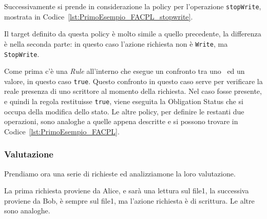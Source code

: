 Successivamente si prende in considerazione la policy per l'operazione \texttt{stopWrite}, mostrata in Codice~\ref{lst:PrimoEsempio_FACPL_stopwrite}.

Il target definito da questa policy è molto simile a quello precedente, la differenza è nella seconda parte: in questo caso l'azione richiesta non è \texttt{Write}, ma \texttt{StopWrite}.\par
Come prima c'è una \textit{Rule} all'interno che esegue un confronto tra uno \statusattribute\ ed un valore, in questo caso \texttt{true}. Questo confronto in questo caso serve per verificare la reale presenza di uno scrittore al momento della richiesta. 
Nel caso fosse presente, e quindi la regola restituisse \texttt{true}, viene eseguita la Obligation Status che si occupa della modifica dello stato.
Le altre policy, per definire le restanti due operazioni, sono analoghe a quelle appena descritte e si possono trovare in Codice~\ref{lst:PrimoEsempio_FACPL}.
\subsubsection{Valutazione}
Prendiamo ora una serie di richieste ed analizziamone la loro valutazione.

La prima richiesta proviene da Alice, e sarà una lettura sul file1, la successiva proviene da Bob, è sempre sul file1, ma l'azione richiesta è di scrittura. Le altre sono analoghe.\par

